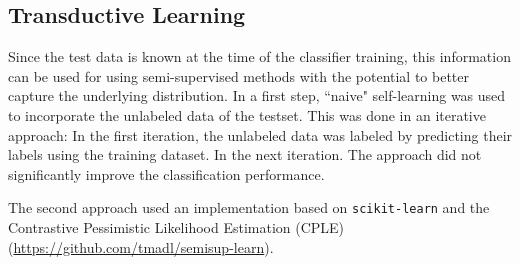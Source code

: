 \subsection{Transductive Learning}

Since the test data is known at the time of the classifier training, this information can be used for using semi-supervised methods with the potential to better capture the underlying distribution. In a first step, ``naive" self-learning was used to incorporate the unlabeled data of the testset. This was done in an iterative approach: In the first iteration, the unlabeled data was labeled by predicting their labels using the training dataset. In the next iteration. The approach did not significantly improve the classification performance. 

The second approach used an implementation based on \texttt{scikit-learn} and the Contrastive Pessimistic Likelihood Estimation (CPLE) (\url{https://github.com/tmadl/semisup-learn}). 

